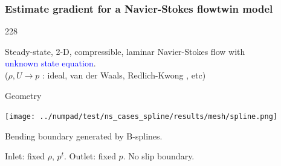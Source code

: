 \documentclass{beamer}
\let\oldcite=\cite
\renewcommand{\cite}[1]{\textcolor[rgb]{.4,.4,.85}{\oldcite{#1}}}
\newcommand{\barrow}{\item[\color{darkred}\ding{228}]}
\newcommand{\carrow}{\item[\color{darkred}\ding{227}]}
\begin{document}
\begin{frame}
    \frametitle{Estimate gradient for a Navier-Stokes flow\hfill \scriptsize{twin model}} \small
    \begin{dinglist}{228}
        \barrow Steady-state, 2-D, compressible, laminar Navier-Stokes flow 
                with \\ \textcolor{blue}{unknown state equation}.\\
                ($\rho, U \rightarrow p$ : ideal, van der Waals, Redlich-Kwong
                \scriptsize \cite{Redlich 49} \small, etc)
    \barrow Geometry
    \vspace{-.2cm}
    \begin{center}
        \texttt{[image: ../numpad/test/ns\_cases\_spline/results/mesh/spline.png]}
    \end{center}
        \barrow Bending boundary generated by B-splines.
        \barrow Inlet: fixed $\rho$, $p^t$. Outlet: fixed $p$. No slip boundary.
    \end{dinglist}
\end{frame}

\end{document}
